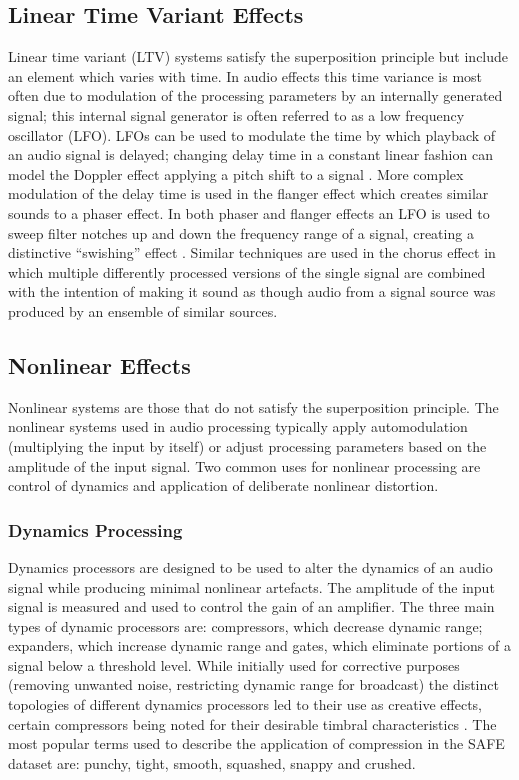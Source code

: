 	\subsection{Linear Time Variant Effects}
	\label{sec:Timbre-AudioProcessing-LTV}
		Linear time variant (LTV) systems satisfy the superposition principle but include an element which varies
		with time. In audio effects this time variance is most often due to modulation of the processing parameters
		by an internally generated signal; this internal signal generator is often referred to as a low frequency
		oscillator (LFO). LFOs can be used to modulate the time by which playback of an audio signal is delayed;
		changing delay time in a constant linear fashion can model the Doppler effect applying a pitch shift to a
		signal \citep{dattorro1997effect}. More complex modulation of the delay time is used in the flanger effect
		which creates similar sounds to a phaser effect. In both phaser and flanger effects an LFO is used to sweep
		filter notches up and down the frequency range of a signal, creating a distinctive ``swishing'' effect
		\citep{huber2010modern}. Similar techniques are used in the chorus effect in which multiple differently
		processed versions of the single signal are combined with the intention of making it sound as though audio
		from a signal source was produced by an ensemble of similar sources.

	\subsection{Nonlinear Effects}
	\label{sec:Timbre-AudioProcessing-Nonlinear}
		Nonlinear systems are those that do not satisfy the superposition principle. The nonlinear systems used in
		audio processing typically apply automodulation (multiplying the input by itself) or adjust processing
		parameters based on the amplitude of the input signal. Two common uses for nonlinear processing are control
		of dynamics and application of deliberate nonlinear distortion.

		\subsubsection*{Dynamics Processing}
			Dynamics processors are designed to be used to alter the dynamics of an audio signal while
			producing minimal nonlinear artefacts. The amplitude of the input signal is measured and
			used to control the gain of an amplifier. The three main types of dynamic processors are:
			compressors, which decrease dynamic range; expanders, which increase dynamic range and gates, which
			eliminate portions of a signal below a threshold level. While initially used for corrective
			purposes (removing unwanted noise, restricting dynamic range for broadcast) the distinct topologies
			of different dynamics processors led to their use as creative effects, certain compressors being
			noted for their desirable timbral characteristics \citep{moore2016an}. The most popular terms used
			to describe the application of compression in the SAFE dataset are: punchy, tight, smooth,
			squashed, snappy and crushed.

